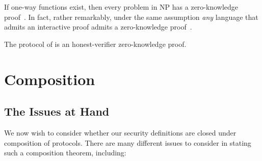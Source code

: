If one-way functions exist, then every problem in NP has a
zero-knowledge proof~\cite{gmw-1991}. In fact, rather remarkably, under the
same assumption \emph{any} language that admits an interactive proof admits a
zero-knowledge proof~\cite{ben-or-et-al-1990}.

\begin{ex}
  The protocol of 
  is an honest-verifier zero-knowledge proof.
\end{ex}

\section{Composition}

\subsection{The Issues at Hand}
\label{sec:composition-issues}

We now wish to consider whether our security definitions are closed under composition
of protocols. There are many different issues to consider in stating such a
composition theorem, including:

